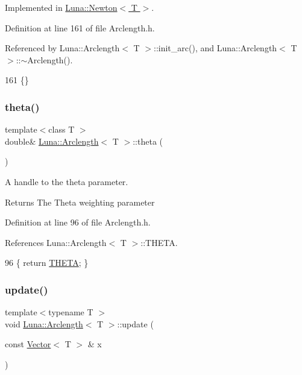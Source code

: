 Implemented in \hyperlink{classLuna_1_1Newton_a1d5ebdbfd8910c40ed58244f6348b13e}{Luna\+::\+Newton$<$ T $>$}.



Definition at line 161 of file Arclength.\+h.



Referenced by Luna\+::\+Arclength$<$ T $>$\+::init\+\_\+arc(), and Luna\+::\+Arclength$<$ T $>$\+::$\sim$\+Arclength().


\begin{DoxyCode}
161 \{\}
\end{DoxyCode}
\mbox{\label{classLuna_1_1Arclength_a7e117fb2774052fc240e0eb0e4aac08c}} 
\subsubsection{\texorpdfstring{theta()}{theta()}}
{\footnotesize\ttfamily template$<$class T $>$ \\
double\& \hyperlink{classLuna_1_1Arclength}{Luna\+::\+Arclength}$<$ T $>$\+::theta (\begin{DoxyParamCaption}{ }\end{DoxyParamCaption})\hspace{0.3cm}{\ttfamily [inline]}}



A handle to the theta parameter. 

\begin{DoxyReturn}{Returns}
The Theta weighting parameter 
\end{DoxyReturn}


Definition at line 96 of file Arclength.\+h.



References Luna\+::\+Arclength$<$ T $>$\+::\+T\+H\+E\+TA.


\begin{DoxyCode}
96 \{ \textcolor{keywordflow}{return} \hyperlink{classLuna_1_1Arclength_aa17766cf4bcbe5b063dc2a95f89baf42}{THETA}; \}
\end{DoxyCode}
\mbox{\label{classLuna_1_1Arclength_a8941ac2150d8a53aaefbf5825553c86b}} 
\subsubsection{\texorpdfstring{update()}{update()}}
{\footnotesize\ttfamily template$<$typename T $>$ \\
void \hyperlink{classLuna_1_1Arclength}{Luna\+::\+Arclength}$<$ T $>$\+::update (\begin{DoxyParamCaption}\item[{const \hyperlink{classLuna_1_1Vector}{Vector}$<$ T $>$ \&}]{x }\end{DoxyParamCaption})\hspace{0.3cm}{\ttfamily [protected]}}



